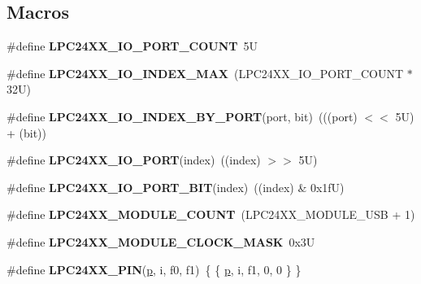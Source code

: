 \subsection*{Macros}
\begin{DoxyCompactItemize}
\item 
\mbox{\label{group__lpc24xx__io_ga7c024b383ff5b1eb3cb7cb8befec1ca4}} 
\#define {\bfseries L\+P\+C24\+X\+X\+\_\+\+I\+O\+\_\+\+P\+O\+R\+T\+\_\+\+C\+O\+U\+NT}~5U
\item 
\mbox{\label{group__lpc24xx__io_ga3336c883b1aea230f80dae37d136cc99}} 
\#define {\bfseries L\+P\+C24\+X\+X\+\_\+\+I\+O\+\_\+\+I\+N\+D\+E\+X\+\_\+\+M\+AX}~(L\+P\+C24\+X\+X\+\_\+\+I\+O\+\_\+\+P\+O\+R\+T\+\_\+\+C\+O\+U\+NT $\ast$ 32\+U)
\item 
\mbox{\label{group__lpc24xx__io_gab031751a800df2ff3f20387ad947e6d4}} 
\#define {\bfseries L\+P\+C24\+X\+X\+\_\+\+I\+O\+\_\+\+I\+N\+D\+E\+X\+\_\+\+B\+Y\+\_\+\+P\+O\+RT}(port,  bit)~(((port) $<$$<$ 5\+U) + (bit))
\item 
\mbox{\label{group__lpc24xx__io_gad917a962bd5cef4d2fa7976830e7302a}} 
\#define {\bfseries L\+P\+C24\+X\+X\+\_\+\+I\+O\+\_\+\+P\+O\+RT}(index)~((index) $>$$>$ 5\+U)
\item 
\mbox{\label{group__lpc24xx__io_ga0bb63836dca2f226a19db6bbc77f644c}} 
\#define {\bfseries L\+P\+C24\+X\+X\+\_\+\+I\+O\+\_\+\+P\+O\+R\+T\+\_\+\+B\+IT}(index)~((index) \& 0x1f\+U)
\item 
\mbox{\label{group__lpc24xx__io_ga3867a4845cd7956e8c8d0d4beb0651a8}} 
\#define {\bfseries L\+P\+C24\+X\+X\+\_\+\+M\+O\+D\+U\+L\+E\+\_\+\+C\+O\+U\+NT}~(L\+P\+C24\+X\+X\+\_\+\+M\+O\+D\+U\+L\+E\+\_\+\+U\+SB + 1)
\item 
\mbox{\label{group__lpc24xx__io_ga8ade5322037aa095708580287b4150d4}} 
\#define {\bfseries L\+P\+C24\+X\+X\+\_\+\+M\+O\+D\+U\+L\+E\+\_\+\+C\+L\+O\+C\+K\+\_\+\+M\+A\+SK}~0x3U
\item 
\mbox{\label{group__lpc24xx__io_ga3be46f2ca48e3f939245952bad4c8048}} 
\#define {\bfseries L\+P\+C24\+X\+X\+\_\+\+P\+IN}(\mbox{\hyperlink{sun4u_2tte_8h_a27952ffc298d15b4fc0e7ee6b2a044ac}{p}},  i,  f0,  f1)~\{ \{ \mbox{\hyperlink{sun4u_2tte_8h_a27952ffc298d15b4fc0e7ee6b2a044ac}{p}}, i, f1, 0, 0 \} \}

\end{DoxyCompactItemize}
